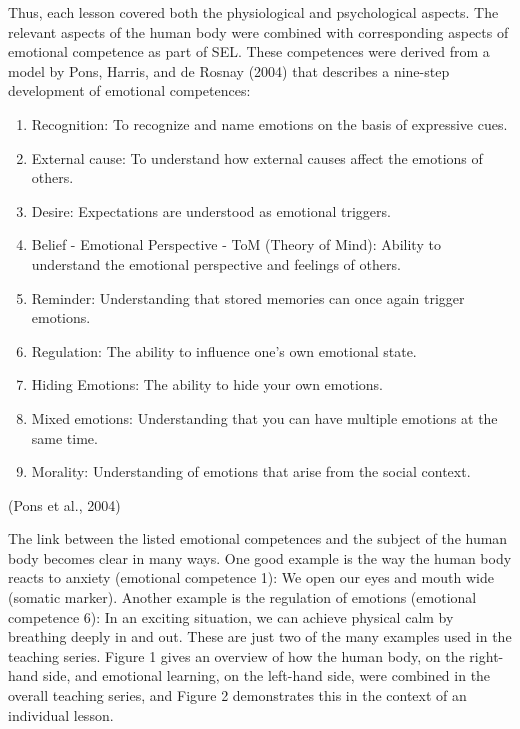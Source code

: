 \documentclass[11.5pt]{sig-alternate} %
\begin{document}
\begin{large}
Thus, each lesson covered both the physiological and psychological aspects. The relevant aspects of the human body were combined with corresponding aspects of emotional competence as part of SEL. These competences were derived from a model by Pons, Harris, and de Rosnay (2004) that describes a nine-step development of emotional competences:

\begin{enumerate}
    \item Recognition: To recognize and name emotions on the basis of expressive cues.
    \item External cause: To understand how external causes affect the emotions of others.
    \item Desire: Expectations are understood as emotional triggers.
    \item Belief - Emotional Perspective - ToM (Theory of Mind): Ability to understand the emotional perspective and feelings of others.
    \item Reminder: Understanding that stored memories can once again trigger emotions.
    \item Regulation: The ability to influence one’s own emotional state.
    \item Hiding Emotions: The ability to hide your own emotions.
    \item Mixed emotions: Understanding that you can have multiple emotions at the same time.
    \item Morality: Understanding of emotions that arise from the social context.
\end{enumerate}
(Pons et al., 2004)

The link between the listed emotional competences and the subject of the human body becomes clear in many ways. One good example is the way the human body reacts to anxiety (emotional competence 1): We open our eyes and mouth wide (somatic marker). Another example is the regulation of emotions (emotional competence 6): In an exciting situation, we can achieve physical calm by breathing deeply in and out. These are just two of the many examples used in the teaching series. Figure 1 gives an overview of how the human body, on the right-hand side, and emotional learning, on the left-hand side, were combined in the overall teaching series, and Figure 2 demonstrates this in the context of an individual lesson. 


\end{large}
\end{document}
